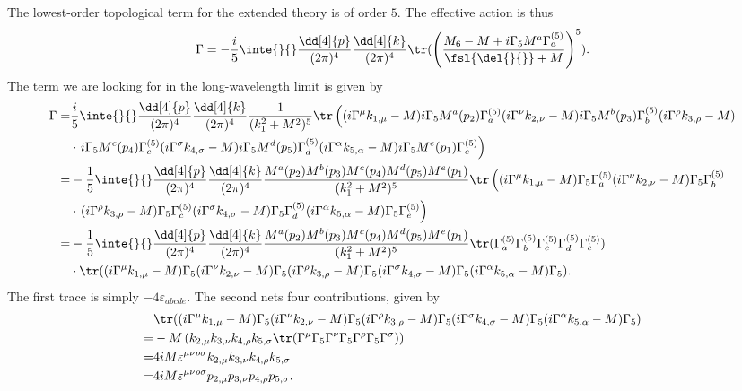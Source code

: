 The lowest-order topological term for the extended theory is of order $5$. The effective action is thus
\begin{align*}
	\Gamma = -\frac{i}{5}\inte{}{}\frac{\dd[4]{p}}{(2\pi)^{4}}\frac{\dd[4]{k}}{(2\pi)^{4}}\tr(\left(\frac{M_{6} - M + i\Gamma_{5}M^{a}\Gamma_{a}^{(5)}}{\fsl{\del{}{}} + M}\right)^{5}).
\end{align*}
The term we are looking for in the long-wavelength limit is given by
\begin{align*}
	\Gamma =& \frac{i}{5}\inte{}{}\frac{\dd[4]{p}}{(2\pi)^{4}}\frac{\dd[4]{k}}{(2\pi)^{4}}\frac{1}{(k_{1}^{2} + M^{2})^{5}}\tr\left((i\Gamma^{\mu}k_{1, \mu} - M)i\Gamma_{5}M^{a}(p_{2})\Gamma_{a}^{(5)}(i\Gamma^{\nu}k_{2, \nu} - M)i\Gamma_{5}M^{b}(p_{3})\Gamma_{b}^{(5)}(i\Gamma^{\rho}k_{3, \rho} - M) \right. \\
	&\cdot \left. i\Gamma_{5}M^{c}(p_{4})\Gamma_{c}^{(5)}(i\Gamma^{\sigma}k_{4, \sigma} - M)i\Gamma_{5}M^{d}(p_{5})\Gamma_{d}^{(5)}(i\Gamma^{\alpha}k_{5, \alpha} - M)i\Gamma_{5}M^{e}(p_{1})\Gamma_{e}^{(5)}\right) \\
	=& -\frac{1}{5}\inte{}{}\frac{\dd[4]{p}}{(2\pi)^{4}}\frac{\dd[4]{k}}{(2\pi)^{4}}\frac{M^{a}(p_{2})M^{b}(p_{3})M^{c}(p_{4})M^{d}(p_{5})M^{e}(p_{1})}{(k_{1}^{2} + M^{2})^{5}}\tr\left((i\Gamma^{\mu}k_{1, \mu} - M)\Gamma_{5}\Gamma_{a}^{(5)}(i\Gamma^{\nu}k_{2, \nu} - M)\Gamma_{5}\Gamma_{b}^{(5)} \right. \\
	 &\cdot \left. (i\Gamma^{\rho}k_{3, \rho} - M)\Gamma_{5}\Gamma_{c}^{(5)}(i\Gamma^{\sigma}k_{4, \sigma} - M)\Gamma_{5}\Gamma_{d}^{(5)}(i\Gamma^{\alpha}k_{5, \alpha} - M)\Gamma_{5}\Gamma_{e}^{(5)}\right) \\
	=& -\frac{1}{5}\inte{}{}\frac{\dd[4]{p}}{(2\pi)^{4}}\frac{\dd[4]{k}}{(2\pi)^{4}}\frac{M^{a}(p_{2})M^{b}(p_{3})M^{c}(p_{4})M^{d}(p_{5})M^{e}(p_{1})}{(k_{1}^{2} + M^{2})^{5}}\tr(\Gamma_{a}^{(5)}\Gamma_{b}^{(5)}\Gamma_{c}^{(5)}\Gamma_{d}^{(5)}\Gamma_{e}^{(5)}) \\
	&\cdot\tr((i\Gamma^{\mu}k_{1, \mu} - M)\Gamma_{5}(i\Gamma^{\nu}k_{2, \nu} - M)\Gamma_{5}(i\Gamma^{\rho}k_{3, \rho} - M)\Gamma_{5}(i\Gamma^{\sigma}k_{4, \sigma} - M)\Gamma_{5}(i\Gamma^{\alpha}k_{5, \alpha} - M)\Gamma_{5}).
\end{align*}
The first trace is simply $-4\varepsilon_{abcde}$. The second nets four contributions, given by
\begin{align*}
	 &\tr((i\Gamma^{\mu}k_{1, \mu} - M)\Gamma_{5}(i\Gamma^{\nu}k_{2, \nu} - M)\Gamma_{5}(i\Gamma^{\rho}k_{3, \rho} - M)\Gamma_{5}(i\Gamma^{\sigma}k_{4, \sigma} - M)\Gamma_{5}(i\Gamma^{\alpha}k_{5, \alpha} - M)\Gamma_{5}) \\
	=& -M\left(k_{2, \mu}k_{3, \nu}k_{4, \rho}k_{5, \sigma}\tr(\Gamma^{\mu}\Gamma_{5}\Gamma^{\nu}\Gamma_{5}\Gamma^{\rho}\Gamma_{5}\Gamma^{\sigma})\right) \\
	=& 4iM\varepsilon^{\mu\nu\rho\sigma}k_{2, \mu}k_{3, \nu}k_{4, \rho}k_{5, \sigma} \\
	=& 4iM\varepsilon^{\mu\nu\rho\sigma}p_{2, \mu}p_{3, \nu}p_{4, \rho}p_{5, \sigma}.
\end{align*}
